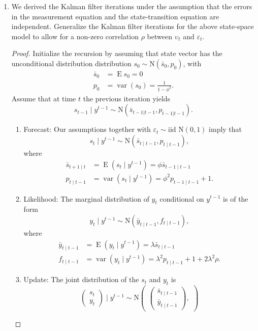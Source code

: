 \documentclass[oneside,reqno]{amsart}
\DeclareMathOperator{\E}{E}
\DeclareMathOperator{\var}{var}
\newcommand{\eps}{\varepsilon}
\newcommand{\ups}{\upsilon}
\newcommand{\N}{\mathrm N}
\theoremstyle{definition}
\begin{document}
\begin{enumerate}
\item
We derived the Kalman filter iterations under the assumption that the errors in the measurement equation and the state-transition equation are independent. Generalize the Kalman filter iterations for the above state-space model to allow for a non-zero correlation $\rho$ between $\ups_t$ and $\eps_t$. 

\begin{proof}
Initialize the recursion by assuming that state vector has the unconditional distribution distribution $s_0 \sim \N(\bar s_0, p_0)$, with 
\begin{align*}
	\bar s_0 &= \E s_0 = 0 \\
	p_0 &= \var(s_0) = \frac{1}{1-\phi^2}. 
\end{align*}
Assume that at time $t$ the previous iteration yields 
\[	
	s_{t-1} \mid y^{t-1} \sim \N(\bar s_{t-1|t-1}, p_{t-1|t-1}).
\]
\begin{enumerate}[label=(\arabic*)]
\item
Forecast: Our assumptions together with $\eps_t \sim \text{iid } \N(0,1)$ imply that 
\[
	s_t \mid y^{t-1} \sim \N(\bar s_{t\mid t-1}, p_{t\mid t-1}),
\] 
where 
\begin{align*}
	\bar s_{t+1 \mid t} &= \E(s_t \mid y^{t-1}) 
		= \phi \bar s_{t-1\mid t-1} \\
	 p_{t \mid t-1} &= \var(s_t \mid y^{t-1}) 
	 	= \phi^2  p_{t-1 \mid t-1}  + 1.
\end{align*}
\item
Likelihood: The marginal distribution of $y_t$ conditional on $y^{t-1}$ is of the form 
\[
	y_t \mid y^{t-1} \sim \N(\bar y_{t \mid t-1}, f_{t\mid t-1}),
\] 
where 
\begin{align*}
	\bar y_{t \mid t-1} &= \E(y_t \mid y^{t-1})
		 = \lambda \bar s_{t \mid t-1} \\
	 f_{t \mid t-1} &= \var(y_t \mid y^{t-1}) 
	 	= \lambda^2 p_{t \mid t-1} +1 + 2 \lambda^2 \rho.
\end{align*}
\item
Update: The joint distribution of the $s_t$ and $y_t$ is 
\[
	\begin{pmatrix}
		s_t \\ y_t 
	\end{pmatrix}
	\mid y^{t-1} \sim \N
	\begin{pmatrix}
		\begin{pmatrix}
			\bar s_{t\mid t-1}  \\ 
			\bar y_{t \mid t-1} 
		\end{pmatrix},

\end{pmatrix}\]
\end{enumerate}
\end{proof}
\end{enumerate}
\end{document}
